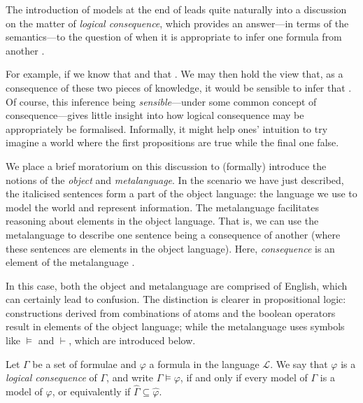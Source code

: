 The introduction of models at the end of  leads quite naturally into a discussion on
the matter of \textit{logical consequence}, which provides an answer---in terms of the semantics---to the question of
when it is appropriate to infer one formula from another \cite{tarski1936consequence}.

For example, if we know that  and that .
We may then hold the view that, as a consequence of these two pieces of knowledge, it would be sensible to infer that
. Of course, this inference being \textit{sensible}---under
some common concept of consequence---gives little insight into how logical consequence may be appropriately be
formalised. Informally, it might help ones' intuition to try imagine a world where the first propositions are true while
the final one false.

  We place a brief moratorium on this discussion to (formally) introduce the notions
of the \textit{object} and \textit{metalanguage}. In the scenario we have just described, the italicised sentences form a
part of the object language: the language we use to model the world and represent information. The metalanguage facilitates
reasoning about elements in the object language. That is, we can use the metalanguage to describe one sentence being a consequence
of another (where these sentences are elements in the object language). Here, \textit{consequence} is an element of the
metalanguage \cite[p 22]{Ben1993Mathematical}.

In this case, both the object and metalanguage are comprised of English, which can certainly lead to confusion. The distinction
is clearer in propositional logic: constructions derived from combinations of atoms and the boolean operators result in
elements of the object language; while the metalanguage uses symbols like $\vDash$ and $\vdash$, which are introduced
below.

\begin{definition}
	\label{definition:logical-consequence} Let $\Gamma$ be a set of formulae and $\varphi$ a formula in the language $\mathcal{L}$.
	We say that $\varphi$ is a \textit{logical consequence} of $\Gamma$, and write $\Gamma \vDash \varphi$, if and only if
	every model of $\Gamma$ is a model of $\varphi$, or equivalently if $\hat{\Gamma}\subseteq \hat{\varphi}$.
\end{definition}

